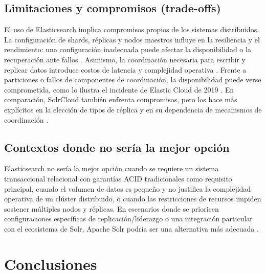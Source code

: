 \documentclass[12pt,a4paper]{article}
\begin{document}
\subsection{Limitaciones y compromisos (trade-offs)}
El uso de Elasticsearch implica compromisos propios de los sistemas distribuidos. La configuración de shards, réplicas y nodos maestros influye en la resiliencia y el rendimiento: una configuración inadecuada puede afectar la disponibilidad o la recuperación ante fallos \cite{elastic_nodes_shards,elastic_resilience}. Asimismo, la coordinación necesaria para escribir y replicar datos introduce costos de latencia y complejidad operativa \cite{elastic_read_write}. Frente a particiones o fallos de componentes de coordinación, la disponibilidad puede verse comprometida, como lo ilustra el incidente de Elastic Cloud de 2019 \cite{elastic_cloud_incident_2019}. En comparación, SolrCloud también enfrenta compromisos, pero los hace más explícitos en la elección de tipos de réplica y en su dependencia de mecanismos de coordinación \cite{solr_shards_indexing,solr_recoveries}.

\subsection{Contextos donde no sería la mejor opción}
Elasticsearch no sería la mejor opción cuando se requiere un sistema transaccional relacional con garantías ACID tradicionales como requisito principal, cuando el volumen de datos es pequeño y no justifica la complejidad operativa de un clúster distribuido, o cuando las restricciones de recursos impiden sostener múltiples nodos y réplicas. En escenarios donde se prioricen configuraciones específicas de replicación/liderazgo o una integración particular con el ecosistema de Solr, Apache Solr podría ser una alternativa más adecuada \cite{deniz-2023,solr_shards_indexing}.

\section{Conclusiones}
\end{document}
